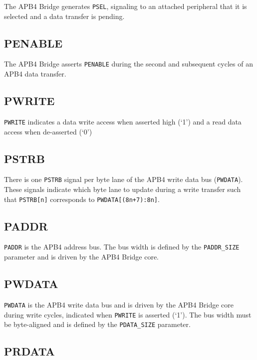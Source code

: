 The APB4 Bridge generates \texttt{PSEL}, signaling to an attached peripheral that
it is selected and a data transfer is pending.

\subsection{PENABLE}\label{penable}

The APB4 Bridge asserts \texttt{PENABLE} during the second and
subsequent cycles of an APB4 data transfer.

\subsection{PWRITE}\label{pwrite}

\texttt{PWRITE} indicates a data write access when asserted high (`1') and a read
data access when de-asserted (`0')

\subsection{PSTRB}\label{pstrb}

There is one \texttt{PSTRB} signal per byte lane of the APB4 write data bus
(\texttt{PWDATA}). These signals indicate which byte lane to update during a
write transfer such that \texttt{PSTRB[n]} corresponds to
\texttt{PWDATA[(8n+7):8n]}.

\subsection{PADDR}\label{paddr}

\texttt{PADDR} is the APB4 address bus. The bus width is defined by the
\texttt{PADDR\_SIZE} parameter and is driven by the APB4 Bridge core.

\subsection{PWDATA}\label{pwdata}

\texttt{PWDATA} is the APB4 write data bus and is driven by the APB4 Bridge core
during write cycles, indicated when \texttt{PWRITE} is asserted (`1'). The bus
width must be byte-aligned and is defined by the \texttt{PDATA\_SIZE} parameter.

\subsection{PRDATA}\label{prdata}


